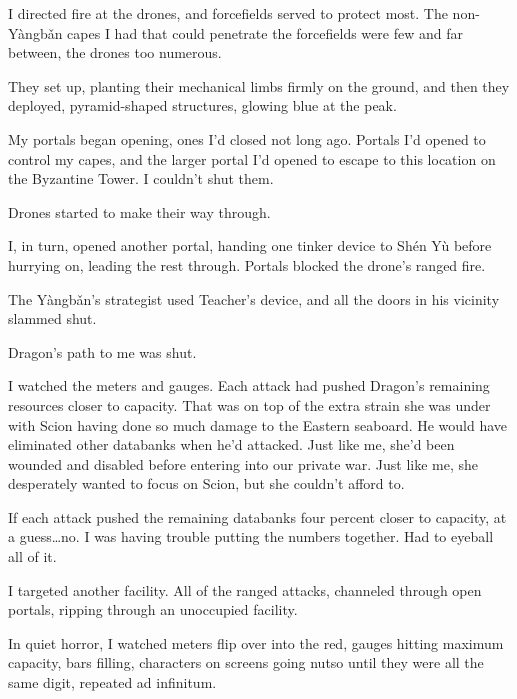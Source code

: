 I directed fire at the drones, and forcefields served to protect most.  The non-Y\`{a}ngb\v{a}n capes I had that could penetrate the forcefields were few and far between, the drones too numerous.



They set up, planting their mechanical limbs firmly on the ground, and then they deployed, pyramid-shaped structures, glowing blue at the peak.



My portals began opening, ones I'd closed not long ago.  Portals I'd opened to control my capes, and the larger portal I'd opened to escape to this location on the Byzantine Tower.  I couldn't shut them.



Drones started to make their way through.



I, in turn, opened another portal, handing one tinker device to Sh\'{e}n Y\`{u} before hurrying on, leading the rest through.  Portals blocked the drone's ranged fire.



The Y\`{a}ngb\v{a}n's strategist used Teacher's device, and all the doors in his vicinity slammed shut.



Dragon's path to me was shut.



I watched the meters and gauges.  Each attack had pushed Dragon's remaining resources closer to capacity.  That was on top of the extra strain she was under with Scion having done so much damage to the Eastern seaboard.  He would have eliminated other databanks when he'd attacked.  Just like me, she'd been wounded and disabled before entering into our private war.  Just like me, she desperately wanted to focus on Scion, but she couldn't afford to.



If each attack pushed the remaining databanks four percent closer to capacity, at a guess\ldots no.  I was having trouble putting the numbers together.  Had to eyeball all of it.



I targeted another facility.  All of the ranged attacks, channeled through open portals, ripping through an unoccupied facility.



In quiet horror, I watched meters flip over into the red, gauges hitting maximum capacity, bars filling, characters on screens going nutso until they were all the same digit, repeated ad infinitum.



